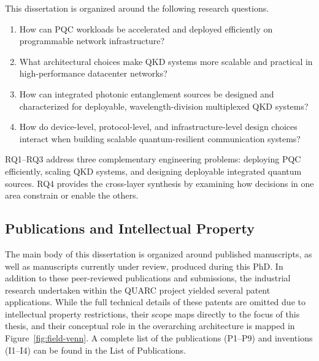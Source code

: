 This dissertation is organized around the following research questions.

\begin{tcolorbox}[
    colback=gray!5!white,
    colframe=blue!50!black,
    title=\textbf{Research Questions (RQs)},
    fonttitle=\bfseries,
    sharp corners,
    boxrule=0.8pt]
\begin{enumerate}[label=\textbf{RQ\arabic*:}, leftmargin=1.2cm]
    \item How can PQC workloads be accelerated and
deployed efficiently on programmable network infrastructure?
    \item What architectural choices make QKD systems more scalable and
practical in high-performance datacenter networks?
    \item How can integrated photonic entanglement sources be designed and
characterized for deployable, wavelength-division multiplexed QKD systems?
    \item How do device-level, protocol-level, and infrastructure-level design
choices interact when building scalable quantum-resilient communication
systems?
\end{enumerate}
\label{en:researchquestions}
\end{tcolorbox}

RQ1--RQ3 address three complementary engineering problems: deploying PQC
efficiently, scaling QKD systems, and designing deployable integrated quantum
sources. RQ4 provides the cross-layer synthesis by examining how decisions in
one area constrain or enable the others.

\subsection{Publications and Intellectual Property}

The main body of this dissertation is organized around published manuscripts,
as well as manuscripts currently under review, produced during this PhD.
In addition to these peer-reviewed publications and submissions, the industrial
research undertaken within the QUARC project yielded several patent applications.
While the full technical details of these patents are omitted due to intellectual
property restrictions, their scope maps directly to the focus of this thesis,
and their conceptual role in the overarching architecture is mapped in
Figure~\ref{fig:field-venn}. A complete list of the publications (P1--P9) and
inventions (I1--I4) can be found in the List of Publications.

